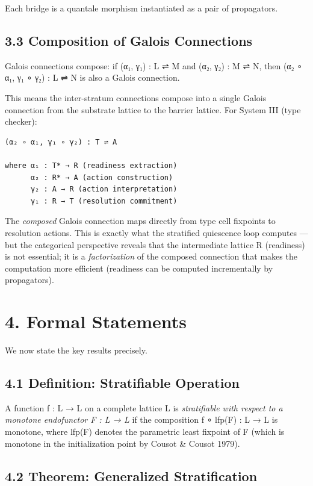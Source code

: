 \documentclass[11pt]{article}
\begin{document}
Each bridge is a quantale morphism instantiated as a pair of propagators.
\subsection{3.3 Composition of Galois Connections}
\label{sec:org85a6f89}

Galois connections compose: if (α₁, γ₁) : L ⇌ M and (α₂, γ₂) : M ⇌ N, then
(α₂ ∘ α₁, γ₁ ∘ γ₂) : L ⇌ N is also a Galois connection.

This means the inter-stratum connections compose into a single Galois connection
from the substrate lattice to the barrier lattice. For System III (type checker):

\begin{verbatim}
(α₂ ∘ α₁, γ₁ ∘ γ₂) : T ⇌ A

where α₁ : T* → R (readiness extraction)
      α₂ : R* → A (action construction)
      γ₂ : A → R (action interpretation)
      γ₁ : R → T (resolution commitment)
\end{verbatim}

The \emph{composed} Galois connection maps directly from type cell fixpoints to
resolution actions. This is exactly what the stratified quiescence loop computes
— but the categorical perspective reveals that the intermediate lattice R
(readiness) is not essential; it is a \emph{factorization} of the composed connection
that makes the computation more efficient (readiness can be computed incrementally
by propagators).
\section{4. Formal Statements}
\label{sec:org21a9a52}

We now state the key results precisely.
\subsection{4.1 Definition: Stratifiable Operation}
\label{sec:orgbc321c2}

A function f : L → L on a complete lattice L is \emph{stratifiable with respect to
a monotone endofunctor F : L → L} if the composition f ∘ lfp(F) : L → L is
monotone, where lfp(F) denotes the parametric least fixpoint of F (which is
monotone in the initialization point by Cousot \& Cousot 1979).
\subsection{4.2 Theorem: Generalized Stratification}
\label{sec:org9fb1a80}
\end{document}
